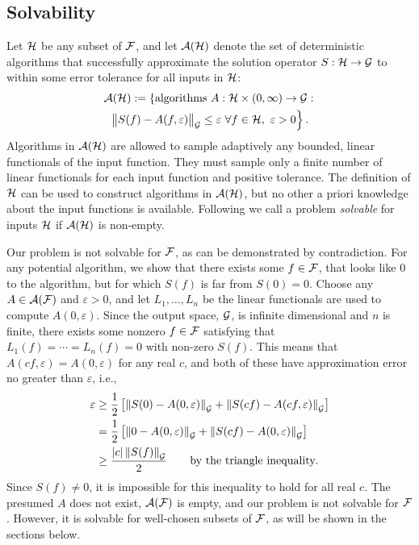 \documentclass[graybox,footinfo]{svmult}
\newcommand{\DHJRnorm}[2][{}]{\ensuremath{\left \lVert #2 \right \rVert}_{#1}}
\newcommand{\DHJRbignorm}[2][{}]{\ensuremath{\bigl \lVert #2 \bigr \rVert}_{#1}}
\newcommand{\DHJRabs}[1]{\ensuremath{{\left \lvert #1 \right \rvert}}}
\begin{document}
\subsection{Solvability}  Let ${\mathcal{H}}$ be any subset of ${\mathcal{F}}$, and let ${\mathcal{A}}({\mathcal{H}})$ denote the set of deterministic algorithms that successfully approximate the solution operator $S : {\mathcal{H}} \to {\mathcal{G}}$ to within some error tolerance for all inputs in ${\mathcal{H}}$:
\begin{multline} \label{adapErrCrit}
\calA(\calH) : = \left\{ \text{algorithms } A:\calH \times (0,\infty) \rightarrow \calG : 
\right . \\ \left .
\DHJRbignorm[\calG]{S(f) - A(f,\varepsilon)} \le \varepsilon \ \forall f \in \calH, \ \varepsilon > 0 
\right \}.
\end{multline}
Algorithms in ${\mathcal{A}}({\mathcal{H}})$ are allowed to sample adaptively any bounded, linear functionals
of the input function.  They must sample only a finite number of linear functionals for each input function and positive tolerance.  The definition of ${\mathcal{H}}$ can be used to construct algorithms in ${\mathcal{A}}({\mathcal{H}})$, but no other a priori knowledge about the input functions is available.  Following \cite{KunEtal19a} we call a problem \emph{solvable} for inputs ${\mathcal{H}}$ if ${\mathcal{A}}({\mathcal{H}})$ is non-empty.

Our problem is not solvable for ${\mathcal{F}}$, as can be demonstrated by contradiction. For any potential algorithm, we show that there exists some $f \in {\mathcal{F}}$, that looks like $0$ to the algorithm, but for which $S(f)$ is far from $S(0) = 0$.   Choose any $A \in {\mathcal{A}}({\mathcal{F}})$ and $\varepsilon > 0$, and let $L_1, \ldots, L_n$ be the linear functionals are used to compute $A(0,\varepsilon)$. Since the output space, ${\mathcal{G}}$, is infinite dimensional and $n$ is finite, there exists some nonzero $f \in {\mathcal{F}}$ satisfying that $L_1(f) = \cdots = L_n(f) = 0$ with non-zero $S(f)$. This means that $A(cf,\varepsilon) = A(0,\varepsilon)$ for any real $c$, and both of these have approximation error no greater than $\varepsilon$, i.e.,
\begin{align*}
    \varepsilon &\ge \frac 12 \left[ \DHJRnorm[\calG]{S(0) - A(0,\varepsilon)} + \DHJRnorm[\calG]{S(cf) - A(cf,\varepsilon)}\right] \\
    & =  \frac 12 \left[ \DHJRnorm[\calG]{0 - A(0,\varepsilon)} + \DHJRnorm[\calG]{S(cf) - A(0,\varepsilon)}\right] \\
    & \ge  \frac {\DHJRabs{c}\DHJRnorm[\calG]{S(f)}}2  \qquad \text{by the triangle inequality}.
\end{align*}
Since $S(f) \ne 0$, it is impossible for this inequality to hold for all real $c$.  The presumed $A$ does not exist, ${\mathcal{A}}({\mathcal{F}})$ is empty, and our problem is not solvable for ${\mathcal{F}}$. However, it is solvable for well-chosen subsets of ${\mathcal{F}}$, as will be shown in the sections below.
\end{document}
